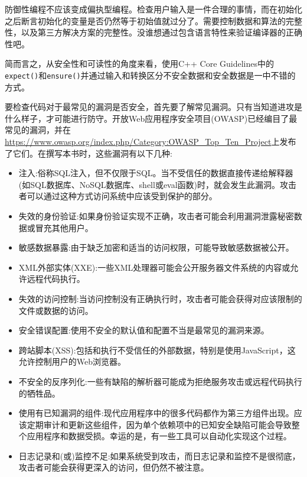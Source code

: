 防御性编程不应该变成偏执型编程。检查用户输入是一件合理的事情，而在初始化之后断言初始化的变量是否仍然等于初始值就过分了。需要控制数据和算法的完整性，以及第三方解决方案的完整性。没谁想通过包含语言特性来验证编译器的正确性吧。

简而言之，从安全性和可读性的角度来看，使用C++ Core Guidelines中的\texttt{expect()}和\texttt{ensure()}并通过输入和转换区分不安全数据和安全数据是一中不错的方式。


要检查代码对于最常见的漏洞是否安全，首先要了解常见漏洞。只有当知道进攻是什么样子，才可能进行防守。开放Web应用程序安全项目(OWASP)已经编目了最常见的漏洞，并在\url{https://www.owasp.org/index.php/Category:OWASP\_Top\_Ten\_Project}上发布了它们。在撰写本书时，这些漏洞有以下几种:

\begin{itemize}
\item 
注入:俗称SQL注入，但不仅限于SQL。当不受信任的数据直接传递给解释器(如SQL数据库、NoSQL数据库、shell或eval函数)时，就会发生此漏洞。攻击者可以通过这种方式访问系统中应该受到保护的部分。

\item 
失效的身份验证:如果身份验证实现不正确，攻击者可能会利用漏洞泄露秘密数据或冒充其他用户。

\item 
敏感数据暴露:由于缺乏加密和适当的访问权限，可能导致敏感数据被公开。

\item 
XML外部实体(XXE):一些XML处理器可能会公开服务器文件系统的内容或允许远程代码执行。

\item 
失效的访问控制:当访问控制没有正确执行时，攻击者可能会获得对应该限制的文件或数据的访问。

\item 
安全错误配置:使用不安全的默认值和配置不当是最常见的漏洞来源。

\item 
跨站脚本(XSS):包括和执行不受信任的外部数据，特别是使用JavaScript，这允许控制用户的Web浏览器。

\item 
不安全的反序列化:一些有缺陷的解析器可能成为拒绝服务攻击或远程代码执行的牺牲品。

\item 
使用有已知漏洞的组件:现代应用程序中的很多代码都作为第三方组件出现。应该定期审计和更新这些组件，因为单个依赖项中的已知安全缺陷可能会导致整个应用程序和数据受损。幸运的是，有一些工具可以自动化实现这个过程。

\item 
日志记录和(或)监控不足:如果系统受到攻击，而日志记录和监控不是很彻底，攻击者可能会获得更深入的访问，但仍然不被注意。
\end{itemize}

